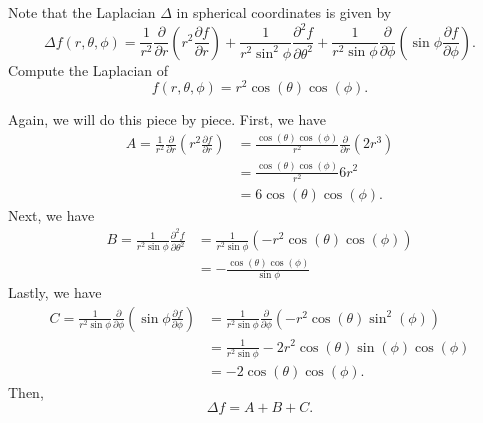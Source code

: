 \documentclass[12pt]{article} %
\begin{document}
\newpage
\begin{problem}
    Note that the Laplacian $\Delta$ in spherical coordinates is given by
    \[
        \Delta f(r,\theta,\phi) = \frac{1}{r^2} \frac{\partial}{\partial r} \left(r^2 \frac{\partial f}{\partial r}\right)+\frac{1}{r^2 \sin^2 \phi} \frac{\partial^2 f}{\partial \theta^2} + \frac{1}{r^2 \sin\phi}\frac{\partial}{\partial \phi} \left(\sin \phi \frac{\partial f}{\partial \phi}\right).
    \]
    Compute the Laplacian of
    \[
       f(r,\theta,\phi) = r^2 \cos(\theta)\cos(\phi).
    \]
\end{problem}
\begin{solution}
 Again, we will do this piece by piece. First, we have
 \begin{align*}
    A=\frac{1}{r^2}\frac{\partial}{\partial r} \left(r^2 \frac{\partial f}{\partial r}\right)&= \frac{\cos (\theta) \cos (\phi)}{r^2}\frac{\partial}{\partial r} \left(2r^3\right) \\
    &= \frac{\cos (\theta) \cos(\phi)}{r^2} 6r^2\\
    &= 6 \cos (\theta) \cos (\phi).
 \end{align*}
 Next, we have
 \begin{align*}
    B=\frac{1}{r^2 \sin \phi} \frac{\partial^2 f}{\partial \theta^2} &= \frac{1}{r^2 \sin \phi} (-r^2\cos(\theta)\cos(\phi))\\
    &= -\frac{\cos(\theta)\cos(\phi)}{\sin\phi}
 \end{align*}
 Lastly, we have
 \begin{align*}
    C=\frac{1}{r^2\sin \phi} \frac{\partial }{\partial \phi} \left(\sin \phi \frac{\partial f}{\partial \phi}\right)&= \frac{1}{r^2\sin \phi} \frac{\partial }{\partial \phi} \left( -r^2 \cos(\theta) \sin^2(\phi)\right)\\
&=\frac{1}{r^2 \sin \phi} -2r^2 \cos(\theta)\sin(\phi)\cos(\phi)\\
&=-2\cos(\theta)\cos(\phi).
 \end{align*}
 Then,
 \[
 \Delta f = A+B+C.
 \]
\end{solution}
\end{document}
